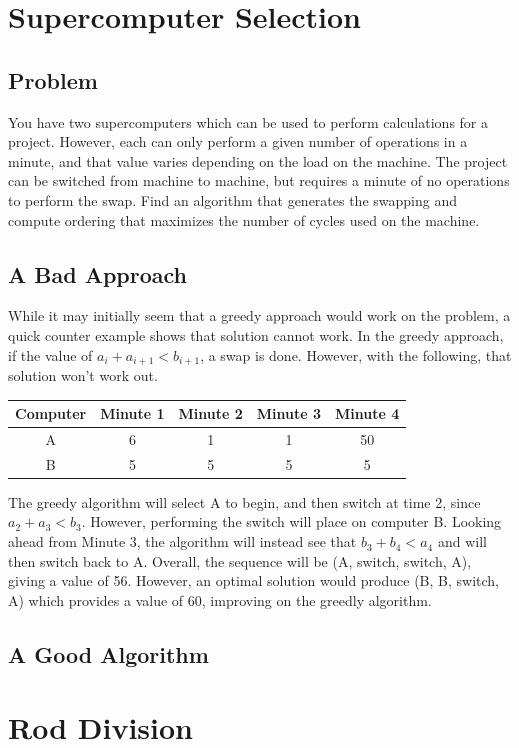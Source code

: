 \documentclass[titlepage]{article}
\numberwithin{equation}{subsection}
\begin{document}
\section{Supercomputer Selection}
\subsection{Problem}
You have two supercomputers which can be used to perform calculations for a project. However, each can only perform
a given number of operations in a minute, and that value varies depending on the load on the machine. The project can
be switched from machine to machine, but requires a minute of no operations to perform the swap. Find an algorithm
that generates the swapping and compute ordering that maximizes the number of cycles used on the machine.
\subsection{A Bad Approach}
While it may initially seem that a greedy approach would work on the problem, a quick counter example shows that
solution cannot work. In the greedy approach, if the value of $a_i + a_{i+1} < b_{i+1}$, a swap is done. However,
with the following, that solution won't work out. 
\begin{center}
  \begin{tabular}{|c|c|c|c|c|}
    \hline
  Computer & Minute 1 & Minute 2 & Minute 3 & Minute 4\\ \hline
  A & 6 & 1 & 1 & 50 \\
  B & 5 & 5 & 5 & 5  \\
  \hline
  \end{tabular}
\end{center}
The greedy algorithm will select A to begin, and then switch at time 2, since $a_2 + a_3 < b_3$. However, performing
the switch will place on computer B. Looking ahead from Minute 3, the algorithm will instead see that $b_3 + b_4 < a_4$
and will then switch back to A. Overall, the sequence will be (A, switch, switch, A), giving a value of 56. However,
an optimal solution would produce (B, B, switch, A) which provides a value of 60, improving on the greedly algorithm.
\subsection{A Good Algorithm}

\section{Rod Division}
\end{document}
